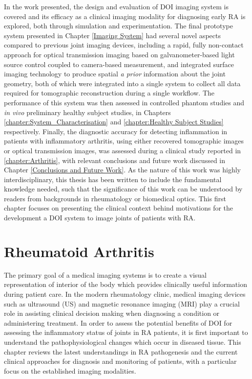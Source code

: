 \documentclass[twoside]{bhamthesis}
\theoremstyle{definition}
\begin{document}
In the work presented, the design and evaluation of DOI imaging system is covered and its efficacy as a clinical imaging modality for diagnosing early RA is explored, both through simulation and experimentation. The final prototype system presented in Chapter \ref{Imaging System} had several novel aspects compared to previous joint imaging devices, including a rapid, fully non-contact approach for optical transmission imaging based on galvanometer-based light source control coupled to camera-based measurement, and integrated surface imaging technology to produce spatial \textit{a prior} information about the joint geometry, both of which were integrated into a single system to collect all data required for tomographic reconstruction during a single workflow. The performance of this system was then assessed in controlled phantom studies and \textit{in vivo} preliminary healthy subject studies, in Chapters \ref{chapter:System_Characterisation} and 
\ref{chapter:Healthy Subject Studies} respectively. Finally, the diagnostic accuracy for detecting inflammation in patients with inflammatory arthritis, using either recovered tomographic images or optical transmission images, was assessed during a clinical study reported in \ref{chapter:Arthritis}, with relevant conclusions and future work discussed in Chapter \ref{Conclusions and Future Work}. As the nature of this work was highly interdisciplinary, this thesis has been written to include the fundamental knowledge needed, such that the significance of this work can be understood by readers from backgrounds in rheumatology or biomedical optics. This first chapter focuses on presenting the clinical context behind motivations for the development a DOI system to image joints of patients with RA.


 \section{Rheumatoid Arthritis}

The primary goal of a medical imaging systems is to create a visual representation of interior of the body which provides clinically useful information during patient care. In the modern rheumatology clinic, medical imaging devices such as ultrasound (US) and magnetic resonance imaging (MRI) play a crucial role in assisting clinical decision making when diagnosing a condition or administering treatment. In order to assess the potential benefits of DOI for assessing the inflammatory status of joints in RA patients, it is first important to understand the pathophysiological changes which occur in diseased tissue. This chapter reviews the latest understandings in RA pathogenesis and the current clinical approaches for diagnosis and monitoring of patients, with a particular focus on the established imaging modalities.
\end{document}
